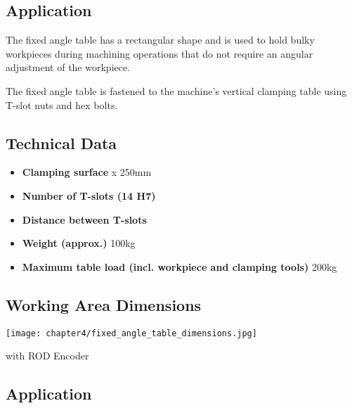 

\subsection*{Application}
The fixed angle table has a rectangular shape and is used to hold bulky workpieces during machining operations that do not require an angular adjustment of the workpiece.

The fixed angle table is fastened to the machine’s vertical clamping table using T-slot nuts and hex bolts.

\subsection*{Technical Data}

\begin{itemize}
   \item \textbf{Clamping surface}  x 250mm
   \item \textbf{Number of T-slots (14 H7)} 
   \item \textbf{Distance between T-slots} \dotfill 63mm
   \item \textbf{Weight (approx.)} \dotfill 100kg
   \item \textbf{Maximum table load (incl. workpiece and clamping tools)} \dotfill 200kg
\end{itemize}

\newpage
\subsection{Working Area Dimensions}

\vspace{3cm}

\begin{center}
    \texttt{[image: chapter4/fixed\_angle\_table\_dimensions.jpg]}    
\end{center}


with ROD Encoder

\setcounter{section}{3}

\subsection*{Application}

